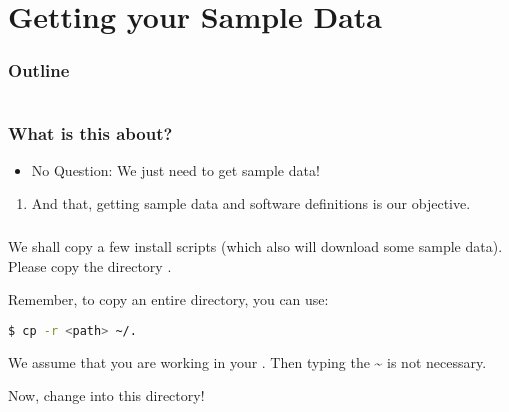 \section{Getting your Sample Data}

\begin{frame}
	\frametitle{Outline}
	\begin{columns}[t]
		\begin{column}{.5\textwidth}
            \tableofcontents[sections={1-7},currentsection]
		\end{column}
		\begin{column}{.5\textwidth}
            \tableofcontents[sections={8-15},currentsection]
		\end{column}
	\end{columns}
\end{frame}

\begin{frame}
	\frametitle{What is this about?}
	\begin{question}[Questions]\begin{itemize}
			\item No Question: We just need to get sample data!
		\end{itemize}
	\end{question}
	\begin{docs}[Objectives]
		\begin{enumerate}
			\item And that, getting sample data and software definitions is our objective.
		\end{enumerate}
	\end{docs}
\end{frame}

\begin{frame}[fragile]
  \frametitle{}
  We shall copy a few install scripts (which also will download some sample data).\newline
  Please copy the directory .\newline
  \begin{hint}
  	Remember, to copy an entire directory, you can use:
  	\begin{lstlisting}[language=Bash, style=Shell]
$ cp -r <path> ~/.
  	\end{lstlisting}
    We assume that you are working in your . Then typing the \textasciitilde{} is not necessary.
  \end{hint}
  \pause
  Now, change into this directory!  
\end{frame}

